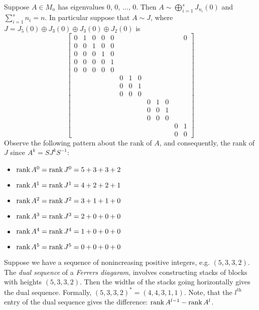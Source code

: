 \begin{example}
Suppose $A \in M_n$ has eigenvalues 0, 0, $\dots$, 0. Then $A \sim \bigoplus_{i=1}^s J_{n_i}(0)$ and $\sum_{i=1}^s n_i = n$. In particular suppose that $A \sim J$, where $J = J_5(0) \oplus J_3(0) \oplus J_3(0) \oplus J_2(0)$ is
$$
\begin{bmatrix} 
        0 & 1 & 0 & 0 & 0 & & & & & & & & 0\\ 
        0 & 0 & 1 & 0 & 0 & & & & & & & & \\
        0 & 0 & 0 & 1 & 0 & & & & & & & & \\
        0 & 0 & 0 & 0 & 1 & & & & & & & & \\
        0 & 0 & 0 & 0 & 0 & & & & & & & & \\
                & & & & & 0 & 1 & 0 & & & & & \\
                & & & & & 0 & 0 & 1 & & & & & \\
                & & & & & 0 & 0 & 0 & & & & & \\
                & & & & & & & & 0 & 1 & 0 & &  \\
                & & & & & & & & 0 & 0 & 1 & &  \\
                & & & & & & & & 0 & 0 & 0 & & \\
                & & & & & & & & & & & 0 & 1 \\
                & & & & & & & & & & & 0 & 0
        \end{bmatrix}
$$
Observe the following pattern about the rank of $A$, and consequently, the rank of $J$ since $A^k = SJ^kS^{-1}$:
\begin{itemize}
    \item $\operatorname{rank} A^0 = \operatorname{rank} J^0 = 5 + 3 + 3 + 2$
    \item $\operatorname{rank} A^1 = \operatorname{rank} J^1 = 4 + 2 + 2 + 1$
    \item $\operatorname{rank} A^2 = \operatorname{rank} J^2 = 3 + 1 + 1 + 0$
    \item $\operatorname{rank} A^3 = \operatorname{rank} J^3 = 2 + 0 + 0 + 0$
    \item $\operatorname{rank} A^4 = \operatorname{rank} J^4 = 1 + 0 + 0 + 0$
    \item $\operatorname{rank} A^5 = \operatorname{rank} J^5 = 0 + 0 + 0 + 0$
\end{itemize}
\end{example}

\begin{definition}
\label{def:Ferrers-diagram-dual-sequence}
Suppose we have a sequence of nonincreasing positive integers, e.g. $(5,3,3,2)$. The \textit{dual sequence} of a \textit{Ferrers diagaram}, involves constructing stacks of blocks with heights $(5,3,3,2)$. Then the widths of the stacks going horizontally gives the dual sequence. Formally, $(5,3,3,2)^* = (4,4,3,1,1)$. Note, that the $l^\text{th}$ entry of the dual sequence gives the difference: $\operatorname{rank} A^{l-1} - \operatorname{rank} A^l$.
\end{definition}


